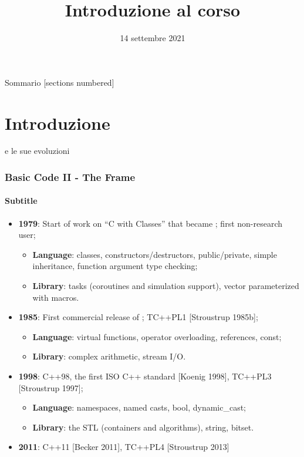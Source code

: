 \documentclass[12pt]{beamer}
\title{Introduzione al corso}
\date{14 settembre 2021}
\begin{document}
\frame{\titlepage}

\begin{frame}{Sommario}
  [sections numbered]
  \tableofcontents%
\end{frame}

\section[Introduzione]{Introduzione}

\begin{frame}[fragile]{\cplusplus e le sue evoluzioni}
\frametitle{Basic Code II - The Frame} %
\framesubtitle{Subtitle} %
    \begin{itemize}[<+- | alert@+>]
        \item \textbf{1979}: Start of work on \enquote{C with Classes} that became \cplusplus; first non-research user;
        \begin{itemize}\footnotesize
            \item \textbf{Language}: classes, constructors/destructors, public/private, simple inheritance, function argument type checking;
            \item \textbf{Library}: tasks (coroutines and simulation support), vector parameterized with macros.
        \end{itemize}
        \item \textbf{1985}: First commercial release of \cplusplus; TC++PL1 [Stroustrup 1985b];
        \begin{itemize}\footnotesize
            \item \textbf{Language}: virtual functions, operator overloading, references, const;
            \item \textbf{Library}: complex arithmetic, stream I/O.
        \end{itemize}
        \item \textbf{1998}: C++98, the first ISO C++ standard [Koenig 1998], TC++PL3 [Stroustrup 1997];
        \begin{itemize}\footnotesize
            \item \textbf{Language}: namespaces, named casts, bool, dynamic\_cast;
            \item \textbf{Library}: the STL (containers and algorithms), string, bitset.
        \end{itemize}
        \framebreak
        \item \textbf{2011}: C++11 [Becker 2011], TC++PL4 [Stroustrup 2013]

\end{itemize}
\end{frame}
\end{document}

